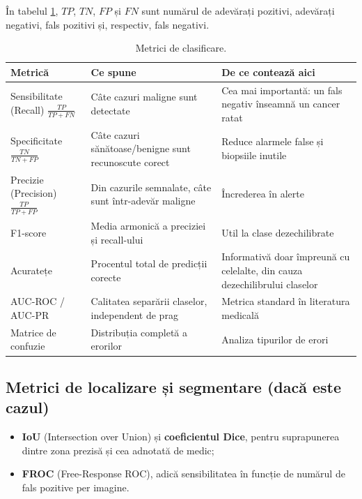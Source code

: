 \documentclass[runningheads,a4paper,11pt]{report}
\begin{document}
În tabelul \ref{tab:metrics}, $TP$, $TN$, $FP$ și $FN$ sunt numărul de adevărați pozitivi, adevărați negativi, fals pozitivi și, respectiv, fals negativi.

\begin{table}[htbp]
	\caption{Metrici de clasificare.}
	\label{tab:metrics}
	\begin{center}
		\begin{tabular}{p{3.6cm}p{4.2cm}p{7.2cm}}
			\textbf{Metrică} & \textbf{Ce spune} & \textbf{De ce contează aici} \\
			\hline\hline
			Sensibilitate (Recall) $\frac{TP}{TP+FN}$ & Câte cazuri maligne sunt detectate & Cea mai importantă: un fals negativ înseamnă un cancer ratat \\
			Specificitate $\frac{TN}{TN+FP}$ & Câte cazuri sănătoase/benigne sunt recunoscute corect & Reduce alarmele false și biopsiile inutile \\
			Precizie (Precision) $\frac{TP}{TP+FP}$ & Din cazurile semnalate, câte sunt într-adevăr maligne & Încrederea în alerte \\
			F1-score & Media armonică a preciziei și recall-ului & Util la clase dezechilibrate \\
			Acuratețe & Procentul total de predicții corecte & Informativă doar împreună cu celelalte, din cauza dezechilibrului claselor \\
			AUC-ROC / AUC-PR & Calitatea separării claselor, independent de prag & Metrica standard în literatura medicală \\
			Matrice de confuzie & Distribuția completă a erorilor & Analiza tipurilor de erori \\
		\end{tabular}
	\end{center}
\end{table}

\subsection{Metrici de localizare și segmentare (dacă este cazul)}

\begin{itemize}
	\item \textbf{IoU} (Intersection over Union) și \textbf{coeficientul Dice}, pentru suprapunerea dintre zona prezisă și cea adnotată de medic;
	\item \textbf{FROC} (Free-Response ROC), adică sensibilitatea în funcție de numărul de fals pozitive per imagine.
\end{itemize}
\end{document}
